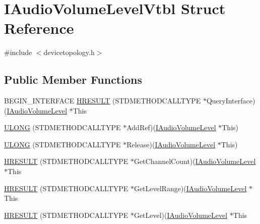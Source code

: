 \hypertarget{struct_i_audio_volume_level_vtbl}{}\section{I\+Audio\+Volume\+Level\+Vtbl Struct Reference}
\label{struct_i_audio_volume_level_vtbl}


{\ttfamily \#include $<$devicetopology.\+h$>$}

\subsection*{Public Member Functions}
\begin{DoxyCompactItemize}
\item 
B\+E\+G\+I\+N\+\_\+\+I\+N\+T\+E\+R\+F\+A\+CE \hyperlink{struct_i_audio_volume_level_vtbl_ae6547da4552c082bc8537b009bfe531d}{H\+R\+E\+S\+U\+LT} (S\+T\+D\+M\+E\+T\+H\+O\+D\+C\+A\+L\+L\+T\+Y\+PE $\ast$Query\+Interface)(\hyperlink{devicetopology_8h_acbf1b6a1081e8664f1fd024b6c9559b5}{I\+Audio\+Volume\+Level} $\ast$This
\item 
\hyperlink{struct_i_audio_volume_level_vtbl_a4ae66b3cf1b5c0c148747b9a977670fe}{U\+L\+O\+NG} (S\+T\+D\+M\+E\+T\+H\+O\+D\+C\+A\+L\+L\+T\+Y\+PE $\ast$Add\+Ref)(\hyperlink{devicetopology_8h_acbf1b6a1081e8664f1fd024b6c9559b5}{I\+Audio\+Volume\+Level} $\ast$This)
\item 
\hyperlink{struct_i_audio_volume_level_vtbl_a07cc8ac4f981586fcd5488cb3a9ad748}{U\+L\+O\+NG} (S\+T\+D\+M\+E\+T\+H\+O\+D\+C\+A\+L\+L\+T\+Y\+PE $\ast$Release)(\hyperlink{devicetopology_8h_acbf1b6a1081e8664f1fd024b6c9559b5}{I\+Audio\+Volume\+Level} $\ast$This)
\item 
\hyperlink{struct_i_audio_volume_level_vtbl_a2679abe567336168d7bf8b845e9d399f}{H\+R\+E\+S\+U\+LT} (S\+T\+D\+M\+E\+T\+H\+O\+D\+C\+A\+L\+L\+T\+Y\+PE $\ast$Get\+Channel\+Count)(\hyperlink{devicetopology_8h_acbf1b6a1081e8664f1fd024b6c9559b5}{I\+Audio\+Volume\+Level} $\ast$This
\item 
\hyperlink{struct_i_audio_volume_level_vtbl_a965e13670684c463af1397479a361445}{H\+R\+E\+S\+U\+LT} (S\+T\+D\+M\+E\+T\+H\+O\+D\+C\+A\+L\+L\+T\+Y\+PE $\ast$Get\+Level\+Range)(\hyperlink{devicetopology_8h_acbf1b6a1081e8664f1fd024b6c9559b5}{I\+Audio\+Volume\+Level} $\ast$This
\item 
\hyperlink{struct_i_audio_volume_level_vtbl_a7a51a1a1fa6c21d5b1b5cfc4042a0bd2}{H\+R\+E\+S\+U\+LT} (S\+T\+D\+M\+E\+T\+H\+O\+D\+C\+A\+L\+L\+T\+Y\+PE $\ast$Get\+Level)(\hyperlink{devicetopology_8h_acbf1b6a1081e8664f1fd024b6c9559b5}{I\+Audio\+Volume\+Level} $\ast$This

\end{DoxyCompactItemize}
